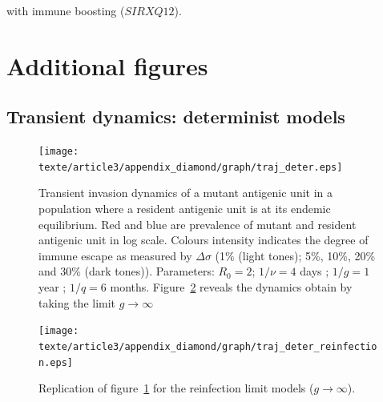 with immune boosting ($SIRXQ12$).

\section{Additional figures}

\subsection{Transient dynamics: determinist models}

\begin{figure}[!hp]
  \center
  \texttt{[image: texte/article3/appendix\_diamond/graph/traj\_deter.eps]}
  \caption{Transient invasion dynamics of a mutant antigenic unit in a
    population where a resident antigenic unit is at its endemic
    equilibrium. Red and blue are prevalence of mutant and resident
    antigenic unit in log scale. Colours intensity indicates the
    degree of immune escape as measured by $\Delta\sigma$ (1\%
    (light tones); 5\%, 10\%, 20\% and 30\% (dark tones)). Parameters:
    $R_0=2$; $1/\nu=4$ days ; $1/g=1$ year ; $1/q=6$
    months. Figure~\ref{fig:traj_deter_reinfection} reveals the
    dynamics obtain by taking the limit $g \to \infty$}
  \label{fig:traj_deter}
\end{figure}

\begin{figure}[!hp]
  \center
  \texttt{[image: texte/article3/appendix\_diamond/graph/traj\_deter\_reinfection.eps]}
  \caption{Replication of figure~\ref{fig:traj_deter} for the
    reinfection limit models ($g \to \infty$).}
  \label{fig:traj_deter_reinfection}
\end{figure}


